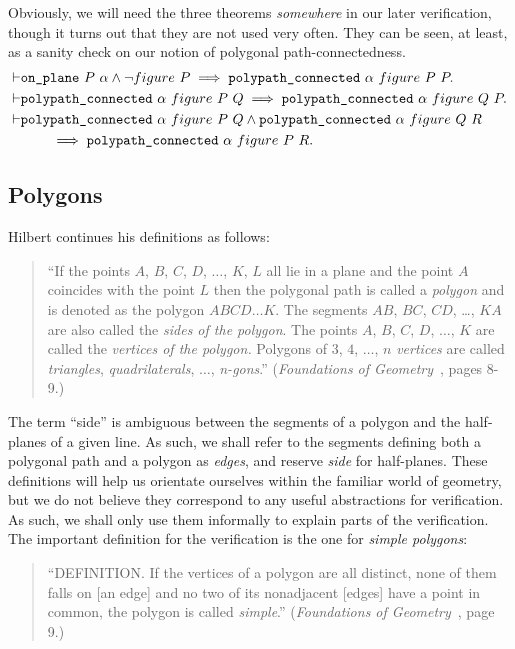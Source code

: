 Obviously, we will need the three theorems \emph{somewhere} in our later verification, though it turns out that they are not used very often. They can be seen, at least, as a sanity check on our notion of polygonal path-connectedness.
\begin{align*}
  \vdash&\texttt{on\_plane}\ P\ \alpha \wedge \neg figure\ P \implies \texttt{polypath\_connected}\ \alpha\ figure\ P\ P.\\
  \vdash&\texttt{polypath\_connected}\ \alpha\ figure\ P\ Q \implies \texttt{polypath\_connected}\ \alpha\ figure\ Q\ P.\\
  \vdash&\texttt{polypath\_connected}\ \alpha\ figure\ P\ Q \wedge \texttt{polypath\_connected}\ \alpha\ figure\ Q\ R\\
  &\qquad\implies \texttt{polypath\_connected}\ \alpha\ figure\ P\ R.
\end{align*}

\subsection{Polygons}\label{sec:polygonFormalisation}
Hilbert continues his definitions as follows:
\begin{quote}
``If the points $A$, $B$, $C$, $D$, $\ldots$, $K$, $L$ all lie in a plane and the point $A$ coincides with the point $L$ then the polygonal path is called a \emph{polygon} and is denoted as the polygon $ABCD\ldots K$. The segments $AB$, $BC$, $CD$, \ldots, $KA$ are also called the \emph{sides of the polygon}. The points $A$, $B$, $C$, $D$, $\ldots$, $K$ are called the \emph{vertices of the polygon.} Polygons of $3$, $4$, $\ldots$, $n$ \emph{vertices} are called \emph{triangles}, \emph{quadrilaterals}, $\ldots$, \emph{n-gons}.'' (\emph{Foundations of Geometry}~\cite{FoundationsOfGeometry}, pages 8-9.)  
\end{quote}

The term ``side'' is ambiguous between the segments of a polygon and the half-planes of a given line. As such, we shall refer to the segments defining both a polygonal path and a polygon as \emph{edges}, and reserve \emph{side} for half-planes. These definitions will help us orientate ourselves within the familiar world of geometry, but we do not believe they correspond to any useful abstractions for verification. As such, we shall only use them informally to explain parts of the verification. The important definition for the verification is the one for \emph{simple polygons}:
\begin{quote}
  ``DEFINITION. If the vertices of a polygon are all distinct, none of them falls on [an edge] and no two of its nonadjacent [edges] have a point in common, the polygon is called \emph{simple}.'' (\emph{Foundations of Geometry}~\cite{FoundationsOfGeometry}, page 9.) 
\end{quote}

